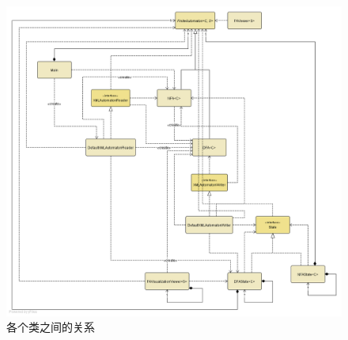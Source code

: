 \documentclass[12pt,a4paper]{article}
\begin{document}
\begin{CJK}{UTF8}{song}
    \begin{figure}
    \centering
    \includegraphics[scale=.3]{UML}
    \caption{各个类之间的关系}
    \label{fig:uml}
    \end{figure}

\newpage
\end{CJK}
\end{document}
